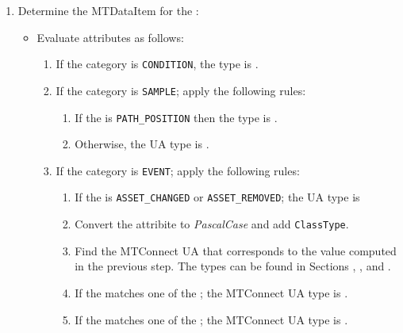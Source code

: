 \begin{enumerate}
  \item Determine the \gls{MTDataItem}  for the  :
  \begin{itemize}
    \item Evaluate  attributes as follows:
    \begin{enumerate}
      \setlength\itemsep{1em}
      \item If the category is \texttt{CONDITION}, the type is .
      
      \item If the category is \texttt{SAMPLE}; apply the following rules:
      \begin{enumerate}
        \item If the  is \texttt{PATH_POSITION} then the type is .
        \item Otherwise, the UA type is .
      \end{enumerate}
      
      \item If the category is \texttt{EVENT}; apply the following rules:
      \begin{enumerate}
        \setlength\itemsep{1em}
        \item If the  is \texttt{ASSET_CHANGED} or \texttt{ASSET_REMOVED}; the UA type is 
        
        \item Convert the  attribite to \textit{PascalCase} and add \texttt{ClassType}.
        
        \item Find the MTConnect UA  that corresponds to the value computed in the previous step.
        The types can be found in Sections , , and .
        
        \item If the  matches one of the ; the MTConnect UA type is .
        
        \item If the  matches one of the ; the MTConnect UA type is .
        

\end{enumerate}
\end{enumerate}
\end{itemize}
\end{enumerate}

